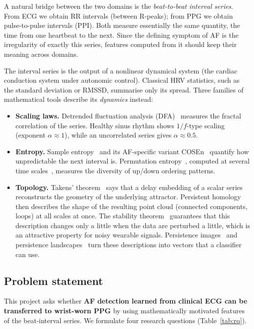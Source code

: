 \documentclass[11pt]{article}
\begin{document}
A natural bridge between the two domains is the \emph{beat-to-beat interval
series}. From ECG we obtain RR intervals (between R-peaks); from PPG we obtain
pulse-to-pulse intervals (PPI). Both measure essentially the same quantity,
the time from one heartbeat to the next. Since the defining symptom of AF is
the irregularity of exactly this series, features computed from it should
keep their meaning across domains.

The interval series is the output of a nonlinear dynamical system (the cardiac
conduction system under autonomic control). Classical HRV statistics, such as
the standard deviation or RMSSD, summarise only its spread. Three families of
mathematical tools describe its \emph{dynamics} instead:
\begin{itemize}
  \item \textbf{Scaling laws.} Detrended fluctuation analysis
  (DFA)~\cite{peng1995} measures the fractal correlation of the series.
  Healthy sinus rhythm shows $1/f$-type scaling (exponent $\alpha \approx 1$),
  while an uncorrelated series gives $\alpha \approx 0.5$.
  \item \textbf{Entropy.} Sample entropy~\cite{richman2000} and its
  AF-specific variant COSEn~\cite{lake2011} quantify how unpredictable the
  next interval is. Permutation entropy~\cite{bandt2002}, computed at several
  time scales~\cite{costa2002}, measures the diversity of up/down ordering
  patterns.
  \item \textbf{Topology.} Takens' theorem~\cite{takens1981} says that a
  delay embedding of a scalar series reconstructs the geometry of the
  underlying attractor. Persistent homology~\cite{edelsbrunner2010} then
  describes the shape of the resulting point cloud (connected components,
  loops) at all scales at once. The stability theorem~\cite{cohensteiner2007}
  guarantees that this description changes only a little when the data are
  perturbed a little, which is an attractive property for noisy wearable
  signals. Persistence images~\cite{adams2017} and persistence
  landscapes~\cite{bubenik2015} turn these descriptions into vectors that a
  classifier can use.
\end{itemize}

\subsection{Problem statement}

This project asks whether \textbf{AF detection learned from clinical ECG can
be transferred to wrist-worn PPG} by using mathematically motivated features
of the beat-interval series. We formulate four research questions
(Table~\ref{tab:rq}).
\end{document}
